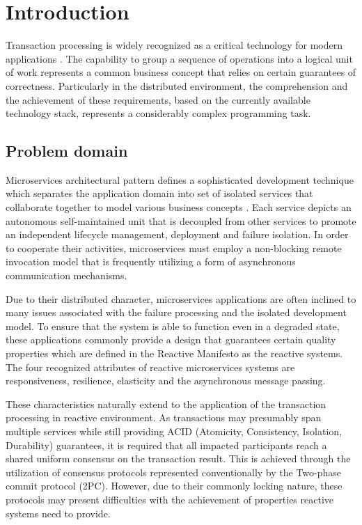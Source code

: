 \documentclass[oneside,
  digital, %
  table,   %
  lof,     %
  lot,     %
]{fithesis3}
\begin{document}
\chapter{Introduction}

Transaction processing is widely recognized as a critical technology for modern applications \cite{java_tran_processing}. The capability to group a sequence of operations into a logical unit of work represents a common business concept that relies on certain guarantees of correctness. Particularly in the distributed environment, the comprehension and the achievement of these requirements, based on the currently available technology stack, represents a considerably complex programming task.

\section{Problem domain}

Microservices architectural pattern defines a sophisticated development technique which separates the application domain into set of isolated services that collaborate together to model various business concepts \cite{building_ms}. Each service depicts an autonomous self-maintained unit that is decoupled from other services to promote an independent lifecycle management, deployment and failure isolation. In order to cooperate their activities, microservices must employ a non-blocking remote invocation model that is frequently utilizing a form of asynchronous communication mechanisms.

Due to their distributed character, microservices applications are often inclined to many issues associated with the failure processing and the isolated development model. To ensure that the system is able to function even in a degraded state, these applications commonly provide a design that guarantees certain quality properties which are defined in the Reactive Manifesto \cite{reactive_manifesto} as the reactive systems. The four recognized attributes of reactive microservices systems are responsiveness, resilience, elasticity and the asynchronous message passing.

These characteristics naturally extend to the application of the transaction processing in reactive environment. As transactions may presumably span multiple services while still providing ACID (Atomicity, Consistency, Isolation, Durability) guarantees, it is required that all impacted participants reach a shared uniform consensus on the transaction result. This is achieved through the utilization of consensus protocols represented conventionally by the Two-phase commit protocol (2PC). However, due to their commonly locking nature, these protocols may present difficulties with the achievement of properties reactive systems need to provide.
\end{document}
